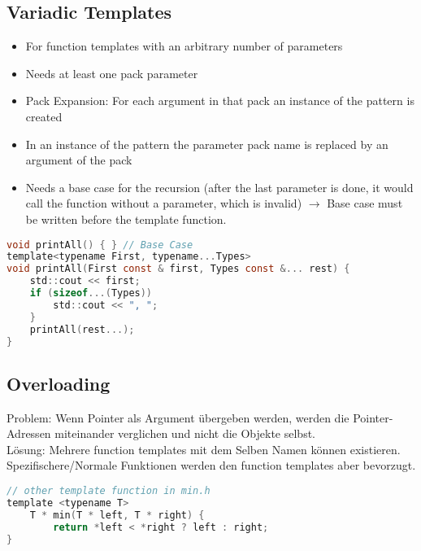 \subsection{Variadic Templates}
\begin{itemize}
    \item For function templates with an arbitrary number of parameters
    \item Needs at least one pack parameter
    \item Pack Expansion: For each argument in that pack an instance of the pattern is created
    \item In an instance of the pattern the parameter pack name is replaced by an argument of the pack
    \item Needs a base case for the recursion (after the last parameter is done, it would call the function without a parameter, which is invalid) $\rightarrow$ Base case must be written before the template function.
\end{itemize}
\begin{lstlisting}[style=frame, style= linenumbers, language=C]
void printAll() { } // Base Case
template<typename First, typename...Types>
void printAll(First const & first, Types const &... rest) {
    std::cout << first;
    if (sizeof...(Types))
        std::cout << ", ";
    }
    printAll(rest...);
}
\end{lstlisting}

\subsection{Overloading}
Problem: Wenn Pointer als Argument übergeben werden, werden die Pointer-Adressen miteinander verglichen und nicht die Objekte selbst.\\
Lösung: Mehrere function templates mit dem Selben Namen können existieren. Spezifischere/Normale Funktionen werden den function templates aber bevorzugt.
\begin{lstlisting}[style=frame, style= linenumbers, language=C]
// other template function in min.h
template <typename T>
    T * min(T * left, T * right) {
        return *left < *right ? left : right;
}
\end{lstlisting}